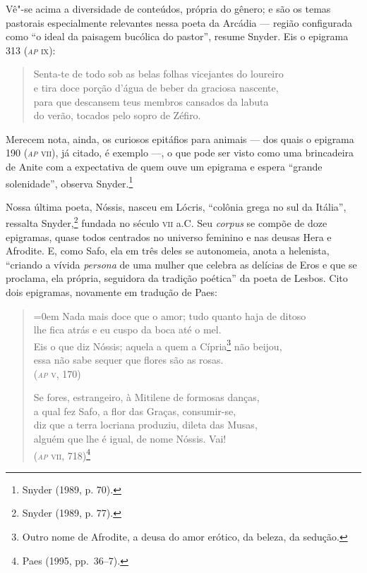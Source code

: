 Vê"-se acima a diversidade de conteúdos, própria do gênero; e são os temas
pastorais especialmente relevantes nessa poeta da Arcádia --- região configurada
como “o ideal da paisagem bucólica do pastor”, resume Snyder. Eis o epigrama
313 (\textsc{\textit{ap}} \textsc{ix}):

\begin{quote}
Senta-te de todo sob as belas folhas vicejantes do loureiro\\
e tira doce porção d’água de beber da graciosa nascente,\\
para que descansem teus membros cansados da labuta\\
do verão, tocados pelo sopro de Zéfiro.
\end{quote}

Merecem nota, ainda, os curiosos epitáfios para animais --- dos quais o epigrama
190 (\textit{\textsc{ap}} \textsc{vii}), já citado, é exemplo ---, o que pode ser visto como uma
brincadeira de Anite com a expectativa de quem ouve um epigrama e espera
“grande solenidade”, observa Snyder.\footnote{ Snyder (1989, p. 70).} 

Nossa última poeta, Nóssis, nasceu em Lócris, “colônia grega no sul da Itália”,
ressalta Snyder,\footnote{ Snyder (1989, p. 77).} fundada no século \textsc{vii} a.C. Seu \textit{corpus} se
compõe de doze epigramas, quase todos centrados no
universo feminino e nas deusas Hera e Afrodite. E, como Safo, ela em três deles
se autonomeia, anota a helenista, “criando a vívida \textit{persona} de uma
mulher que celebra as delícias de Eros e que se proclama, ela própria,
seguidora da tradição poética” da poeta de Lesbos. Cito dois epigramas,
novamente em tradução de Paes:

\begin{quote}\parindent=0em
Nada mais doce que o amor; tudo quanto haja de ditoso\\
lhe fica atrás e eu cuspo da boca até o mel.\\
Eis o que diz Nóssis; aquela a quem a Cípria\footnote{ Outro nome de
Afrodite, a deusa do amor erótico, da beleza, da sedução.} não beijou,\\
essa não sabe sequer que flores são as rosas.\\
\mbox{}\hfill (\textsc{\textit{ap} v}, 170)

\smallskip

Se fores, estrangeiro, à Mitilene de formosas danças,\\
a qual fez Safo, a flor das Graças, consumir-se,\\ 
diz que a terra locriana produziu, dileta das Musas,\\
alguém que lhe é igual, de nome Nóssis. Vai!\\
\mbox{}\hfill (\textsc{\textit{ap} vii}, 718)\footnote{ Paes (1995, pp.~36--7).}
\end{quote}

